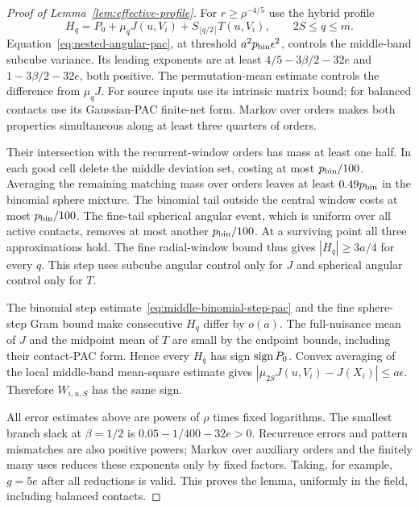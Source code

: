 \begin{proof}[Proof of Lemma~\ref{lem:effective-profile}]
For $r\ge\rho^{-4/5}$ use the hybrid profile
\[
 H_q=P_0+\mu_qJ(u,V_i)+S_{\lfloor q/2\rfloor}T(u,V_i),
                        \qquad2S\le q\le m.
\]
Equation~\eqref{eq:nested-angular-pac}, at threshold
$a^2p_{\rm bin}\epsilon^2$, controls the middle-band subcube variance.
Its leading exponents are at least
$4/5-3\beta/2-32e$ and $1-3\beta/2-32e$, both positive.
The permutation-mean estimate controls the difference from $\mu_qJ$.
For source inputs use its intrinsic matrix bound; for balanced contacts
use its Gaussian-PAC finite-net form. Markov over orders makes both
properties simultaneous along at least three quarters of orders.

Their intersection with the recurrent-window orders has mass at least
one half. In each good cell delete the middle deviation set, costing
at most $p_{\rm bin}/100$. Averaging the remaining matching mass over
orders leaves at least $0.49p_{\rm bin}$ in the binomial sphere mixture.
The binomial tail outside the central window costs at most
$p_{\rm bin}/100$. The fine-tail spherical angular event, which is
uniform over all active contacts, removes at most another
$p_{\rm bin}/100$. At a surviving point all three approximations hold.
The fine radial-window bound thus gives $|H_q|\ge3a/4$ for every $q$.
This step uses subcube angular control only for $J$ and spherical angular
control only for $T$.

The binomial step estimate~\eqref{eq:middle-binomial-step-pac} and the
fine sphere-step Gram bound make consecutive $H_q$ differ by $o(a)$.
The full-nuisance mean of $J$ and the midpoint mean of $T$ are small
by the endpoint bounds, including their contact-PAC form. Hence every
$H_q$ has sign $\operatorname{sign} P_0$. Convex averaging of the local middle-band
mean-square estimate gives
$|\mu_{2S}J(u,V_i)-J(X_i)|\le a\epsilon$.
Therefore $W_{i,u,S}$ has the same sign.

All error estimates above are powers of $\rho$ times fixed logarithms.
The smallest branch slack at $\beta=1/2$ is
$0.05-1/400-32e>0$. Recurrence errors and pattern mismatches are also
positive powers; Markov over auxiliary orders and the finitely many
uses reduces these exponents only by fixed factors. Taking, for example,
$g=5e$ after all reductions is valid. This proves the lemma, uniformly
in the field, including balanced contacts.
\end{proof}

